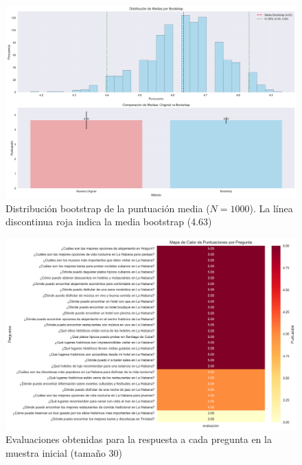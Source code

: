 \documentclass[10pt]{llncs}
\begin{document}
\begin{figure}
\centering
\includegraphics[width=1\textwidth]{../src/experiments/final_evaluation/bootstrap_distribution_20250621-210327.png}
\caption{Distribución bootstrap de la puntuación media ($N=1000$). La línea discontinua roja indica la media bootstrap (4.63)}
\label{fig:boot_dist_3}
\end{figure}

\begin{figure}
\centering
\includegraphics[width=1\textwidth]{../src/experiments/final_evaluation/quality_heatmap_20250621-210327.png}
\caption{Evaluaciones obtenidas para la respuesta a cada pregunta en la muestra inicial (tamaño 30)}
\label{fig:eval_3}
\end{figure}
\end{document}
